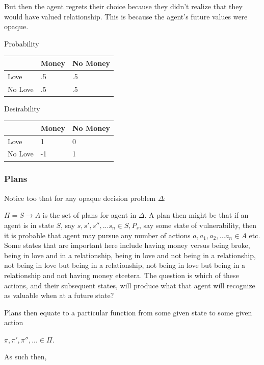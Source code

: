 \documentclass[
  letterpaper,
  DIV=11,
  numbers=noendperiod]{scrartcl}
\newcounter{none} %
\begin{document}
But then the agent regrets their choice because they didn't realize that
they would have valued relationship. This is because the agent's future
values were opaque.

Probability

{\def\LTcaptype{none} %
\begin{longtable}[]{@{}lll@{}}
\toprule\noalign{}
& Money & No Money \\
\midrule\noalign{}
\endhead
\bottomrule\noalign{}
\endlastfoot
Love & .5 & .5 \\
No Love & .5 & .5 \\
\end{longtable}
}

Desirability

{\def\LTcaptype{none} %
\begin{longtable}[]{@{}lll@{}}
\toprule\noalign{}
& Money & No Money \\
\midrule\noalign{}
\endhead
\bottomrule\noalign{}
\endlastfoot
Love & 1 & 0 \\
No Love & -1 & 1 \\
\end{longtable}
}

\subsubsection{Plans}\label{plans}

Notice too that for any opaque decision problem \(\Delta\):

\(\Pi = S \rightarrow A\) is the set of plans for agent in \(\Delta\). A
plan then might be that if an agent is in state \(S\), say
\(s, s', s'', . . . s_n \in S, P_s\), say some state of vulnerability,
then it is probable that agent may pursue any number of actions
\(a, a_1, a_2, . . . a_n \in A\) etc. Some states that are important
here include having money versus being broke, being in love and in a
relationship, being in love and not being in a relationship, not being
in love but being in a relationship, not being in love but being in a
relationship and not having money etcetera. The question is which of
these actions, and their subsequent states, will produce what that agent
will recognize as valuable when at a future state?

Plans then equate to a particular function from some given state to some
given action

\(\pi, \pi', \pi'', . . . \in \Pi\).

As such then,
\end{document}
